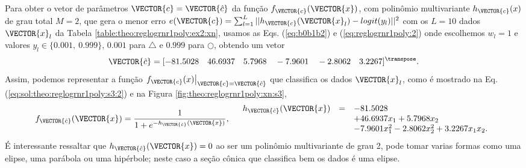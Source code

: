 \begin{SolutionT}\label{sol:theo:reglogrnr1poly:s3}
Para obter o vetor de parâmetros $\VECTOR{c}=\VECTOR{\hat{c}}$ da função $f_{\VECTOR{c}}(\VECTOR{x})$, 
com polinômio multivariante $h_{\VECTOR{c}}(x)$ de grau total $M=2$,
que gera o menor erro $e(\VECTOR{c}) =  \sum_{l=1}^{L} ||h_{\VECTOR{c}}(\VECTOR{x}_l)-logit(y_l)||^2$
com os $L=10$ dados $\VECTOR{x}_l$ da Tabela \ref{table:theo:reglogrnr1poly:ex2:xn},
usamos as Eqs. (\ref{eq:b0b1b2}) e  (\ref{eq:reglogrnr1poly:2}) onde escolhemos $w_l=1$ e valores $y_l \in \{0.001,~ 0.999\}$,
$0.001$ para $\bigtriangleup$ e $0.999$ para $\bigcirc$, 
obtendo um vetor 
\begin{equation}
\VECTOR{\hat{c}}=[-81.5028\quad 46.6937\quad 5.7968\quad -7.9601\quad -2.8062\quad 3.2267]^{\transpose}.             
\end{equation}
Assim, podemos representar a função $\left.f_{\VECTOR{c}}(x)\right|_{\VECTOR{c}=\VECTOR{\hat{c}}}$
 que classifica os dados $\VECTOR{x}_l$, 
como é mostrado na Eq. (\ref{eq:sol:theo:reglogrnr1poly:s3:2}) e na Figura \ref{fig:theo:reglogrnr1poly:xn:s3},
\begin{equation}\label{eq:sol:theo:reglogrnr1poly:s3:2}
f_{\VECTOR{\hat{c}}}(\VECTOR{x})= \frac{1}{1+e^{-h_{\VECTOR{\hat{c}}}(\VECTOR{x})}},
\quad
\begin{array}{lll}
h_{\VECTOR{\hat{c}}}(\VECTOR{x}) & = & -81.5028\\
                         ~ & ~ & +46.6937 x_1 +5.7968 x_2 \\
                         ~ & ~ & -7.9601 x_1^2 -2.8062  x_2^2 + 3.2267 x_1 x_2.
\end{array}
\end{equation}
É interessante ressaltar que $h_{\VECTOR{\hat{c}}}(\VECTOR{x})=0$ ao ser um polinômio multivariante de grau 2,
pode tomar varias formas como uma elipse, uma parábola ou uma hipérbole;
neste caso a seção cônica que classifica bem os dados é uma elipse.
\end{SolutionT}
